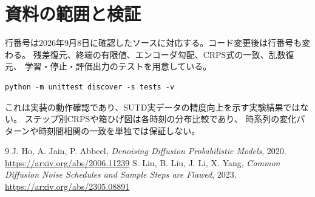 \documentclass[a4paper,11pt]{ltjsarticle}
\begin{document}
\section{資料の範囲と検証}
行番号は2026年9月8日に確認したソースに対応する。コード変更後は行番号も変わる。
残差復元、終端の有限値、エンコーダ勾配、CRPS式の一致、乱数復元、
学習・停止・評価出力のテストを用意している。
\begin{verbatim}
python -m unittest discover -s tests -v
\end{verbatim}
これは実装の動作確認であり、SUTD実データの精度向上を示す実験結果ではない。
ステップ別CRPSや箱ひげ図は各時刻の分布比較であり、
時系列の変化パターンや時刻間相関の一致を単独では保証しない。

\begin{thebibliography}{9}
 J. Ho, A. Jain, P. Abbeel,
\emph{Denoising Diffusion Probabilistic Models}, 2020.
\url{https://arxiv.org/abs/2006.11239}
 S. Lin, B. Liu, J. Li, X. Yang,
\emph{Common Diffusion Noise Schedules and Sample Steps are Flawed}, 2023.
\url{https://arxiv.org/abs/2305.08891}
\end{thebibliography}
\end{document}
